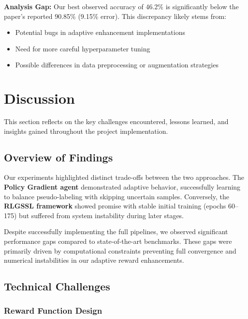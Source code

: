 \documentclass{scrartcl}
\begin{document}
\textbf{Analysis Gap:} Our best observed accuracy of 46.2\% is significantly below the paper's reported 90.85\% (9.15\% error). This discrepancy likely stems from:
\begin{itemize}
    \item Potential bugs in adaptive enhancement implementations
    \item Need for more careful hyperparameter tuning
    \item Possible differences in data preprocessing or augmentation strategies
\end{itemize}



\section{Discussion}

This section reflects on the key challenges encountered, lessons learned, and insights gained throughout the project implementation.

\subsection{Overview of Findings}
Our experiments highlighted distinct trade-offs between the two approaches. The \textbf{Policy Gradient agent} demonstrated adaptive behavior, successfully learning to balance pseudo-labeling with skipping uncertain samples. Conversely, the \textbf{RLGSSL framework} showed promise with stable initial training (epochs 60--175) but suffered from system instability during later stages.

Despite successfully implementing the full pipelines, we observed significant performance gaps compared to state-of-the-art benchmarks. These gaps were primarily driven by computational constraints preventing full convergence and numerical instabilities in our adaptive reward enhancements.

\subsection{Technical Challenges}

\subsubsection{Reward Function Design}
\end{document}

